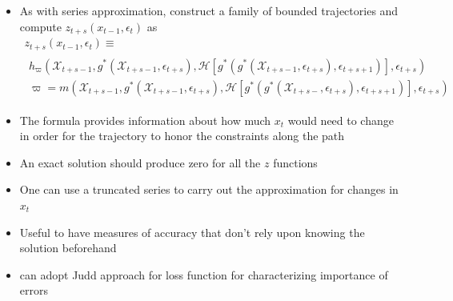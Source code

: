 \documentclass[12pt]{article}
\begin{document}
{\small

  \begin{itemize}
  \item As with series approximation,
 construct a family of bounded trajectories and compute
$  z_{t+s}(x_{t-1},\epsilon_t)$ as  %
{
\begin{gather}
  z_{t+s}(x_{t-1},\epsilon_t) \equiv\\
   \begin{split}
 h_{\varpi}(\mathcal{X}_{t+s-1},g^\ast(\mathcal{X}_{t+s-1},\epsilon_{t+s}),\mathcal{H}[g^\ast(g^\ast(\mathcal{X}_{t+s-1},\epsilon_{t+s}),\epsilon_{t+s+1})],\epsilon_{t+s}) \label{theProblem} \\
\varpi= m(\mathcal{X}_{t+s-1},g^\ast(\mathcal{X}_{t+s-1},\epsilon_{t+s}),\mathcal{H}[g^\ast(g^\ast(\mathcal{X}_{t+s-},\epsilon_{t+s}),\epsilon_{t+s+1})],\epsilon_{t+s}) 
   \end{split}
  \end{gather}
}
\item The formula  provides information about how much $x_{t}$ would need
to change in order for the trajectory to honor the constraints along the path
\item An exact solution should produce zero for all the $z$ functions
\item One can use a truncated series to carry out the approximation for changes in $x_t$
\item Useful to have measures of accuracy that don't rely upon knowing the solution beforehand
\item can adopt Judd approach for loss function for characterizing importance of errors
  \end{itemize}
}











\end{document}
